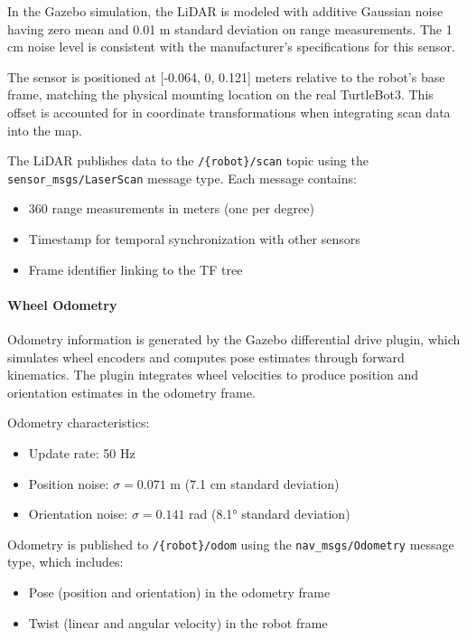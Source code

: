 \documentclass[11pt]{article}
\begin{document}
In the Gazebo simulation, the LiDAR is modeled with additive Gaussian noise having zero mean and 0.01 m standard deviation on range measurements. The 1 cm noise level is consistent with the manufacturer's specifications for this sensor.

The sensor is positioned at [-0.064, 0, 0.121] meters relative to the robot's base frame, matching the physical mounting location on the real TurtleBot3. This offset is accounted for in coordinate transformations when integrating scan data into the map.

The LiDAR publishes data to the \texttt{/\{robot\}/scan} topic using the \texttt{sensor\_msgs/LaserScan} message type. Each message contains:
\begin{itemize}
	\item 360 range measurements in meters (one per degree)
	\item Timestamp for temporal synchronization with other sensors
	\item Frame identifier linking to the TF tree
\end{itemize}

\paragraph{Wheel Odometry}

Odometry information is generated by the Gazebo differential drive plugin, which simulates wheel encoders and computes pose estimates through forward kinematics. The plugin integrates wheel velocities to produce position and orientation estimates in the odometry frame.

Odometry characteristics:
\begin{itemize}
	\item Update rate: 50 Hz
	\item Position noise: $\sigma = 0.071$ m (7.1 cm standard deviation)
	\item Orientation noise: $\sigma = 0.141$ rad (8.1° standard deviation)
\end{itemize}


Odometry is published to \texttt{/\{robot\}/odom} using the \texttt{nav\_msgs/Odometry} message type, which includes:
\begin{itemize}
	\item Pose (position and orientation) in the odometry frame
	\item Twist (linear and angular velocity) in the robot frame
\end{itemize}
\end{document}

